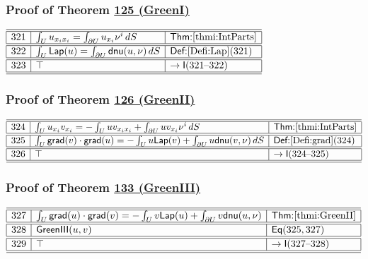 \documentclass[11pt,reqno]{amsart}
\begin{document}
\medskip

\subsubsection*{Proof of Theorem \hyperlink{thm:GreenI}{125 (\textsf{GreenI})}}

\noindent$%
\begin{array}{|r|l|l|}
\hline\hline
321 & \int_{U}u_{x_{i}x_{i}}=\int_{\partial U}u_{x_{i}}\nu^{i}\,dS & \textsf{Thm:}\ref{thmi:IntParts} \\ \hline\hline
322 & \int_{U}\mathsf{Lap}(u)=\int_{\partial U}\mathsf{dnu}(u,\nu)\,dS & \textsf{Def:}\ref{Defi:Lap}(321) \\ \hline\hline
323 & \top & \to\mathsf{I}(321\text{--}322) \\ \hline\hline
\end{array}%
$

\medskip

\subsubsection*{Proof of Theorem \hyperlink{thm:GreenII}{126 (\textsf{GreenII})}}

\noindent$%
\begin{array}{|r|l|l|}
\hline\hline
324 & \int_{U}u_{x_{i}}v_{x_{i}}=-\int_{U}uv_{x_{i}x_{i}}+\int_{\partial U}uv_{x_{i}}\nu^{i}\,dS & \textsf{Thm:}\ref{thmi:IntParts} \\ \hline\hline
325 & \int_{U}\mathsf{grad}(v)\cdot\mathsf{grad}(u)=-\int_{U}u\mathsf{Lap}(v)+\int_{\partial U}u\mathsf{dnu}(v,\nu)\,dS & \textsf{Def:}\ref{Defi:grad}(324) \\ \hline\hline
326 & \top & \to\mathsf{I}(324\text{--}325) \\ \hline\hline
\end{array}%
$

\medskip

\subsubsection*{Proof of Theorem \hyperlink{thm:GreenIII}{133 (\textsf{GreenIII})}}

\noindent$%
\begin{array}{|r|l|l|}
\hline\hline
327 & \int_{U}\mathsf{grad}(u)\cdot\mathsf{grad}(v)=-\int_{U}v\mathsf{Lap}(u)+\int_{\partial U}v\mathsf{dnu}(u,\nu) & \textsf{Thm:}\ref{thmi:GreenII} \\ \hline\hline
328 & \mathsf{GreenIII}(u,v) & \mathsf{Eq}(325,327) \\ \hline\hline
329 & \top & \to\mathsf{I}(327\text{--}328) \\ \hline\hline
\end{array}%
$
\end{document}
